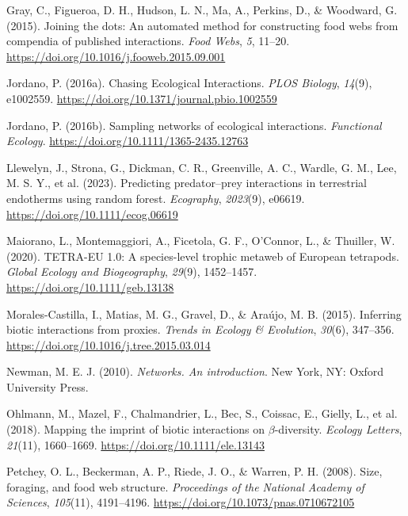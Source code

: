 \documentclass[
]{agujournal2019}
\newlength{\cslhangindent}
\newenvironment{CSLReferences}[2] %
 {\begin{list}{}{%
  \setlength{\itemindent}{0pt}
  \setlength{\leftmargin}{0pt}
  \setlength{\parsep}{0pt}
  \ifodd #1
   \setlength{\leftmargin}{\cslhangindent}
   \setlength{\itemindent}{-1\cslhangindent}
  \fi
  \setlength{\itemsep}{#2\baselineskip}}}
 {\end{list}}
\begin{document}
\begin{CSLReferences}{1}{0}
Gray, C., Figueroa, D. H., Hudson, L. N., Ma, A., Perkins, D., \&
Woodward, G. (2015). Joining the dots: {An} automated method for
constructing food webs from compendia of published interactions.
\emph{Food Webs}, \emph{5}, 11--20.
\url{https://doi.org/10.1016/j.fooweb.2015.09.001}

Jordano, P. (2016a). Chasing {Ecological Interactions}. \emph{PLOS
Biology}, \emph{14}(9), e1002559.
\url{https://doi.org/10.1371/journal.pbio.1002559}

Jordano, P. (2016b). Sampling networks of ecological interactions.
\emph{Functional Ecology}. \url{https://doi.org/10.1111/1365-2435.12763}

Llewelyn, J., Strona, G., Dickman, C. R., Greenville, A. C., Wardle, G.
M., Lee, M. S. Y., et al. (2023). Predicting predator--prey interactions
in terrestrial endotherms using random forest. \emph{Ecography},
\emph{2023}(9), e06619. \url{https://doi.org/10.1111/ecog.06619}

Maiorano, L., Montemaggiori, A., Ficetola, G. F., O'Connor, L., \&
Thuiller, W. (2020). {TETRA-EU} 1.0: {A} species-level trophic metaweb
of {European} tetrapods. \emph{Global Ecology and Biogeography},
\emph{29}(9), 1452--1457. \url{https://doi.org/10.1111/geb.13138}

Morales-Castilla, I., Matias, M. G., Gravel, D., \& Araújo, M. B.
(2015). Inferring biotic interactions from proxies. \emph{Trends in
Ecology \& Evolution}, \emph{30}(6), 347--356.
\url{https://doi.org/10.1016/j.tree.2015.03.014}

Newman, M. E. J. (2010). \emph{Networks. {An} introduction}. New York,
NY: Oxford University Press.

Ohlmann, M., Mazel, F., Chalmandrier, L., Bec, S., Coissac, E., Gielly,
L., et al. (2018). Mapping the imprint of biotic interactions on
{\(\beta\)}-diversity. \emph{Ecology Letters}, \emph{21}(11),
1660--1669. \url{https://doi.org/10.1111/ele.13143}

Petchey, O. L., Beckerman, A. P., Riede, J. O., \& Warren, P. H. (2008).
Size, foraging, and food web structure. \emph{Proceedings of the
National Academy of Sciences}, \emph{105}(11), 4191--4196.
\url{https://doi.org/10.1073/pnas.0710672105}


\end{CSLReferences}
\end{document}
